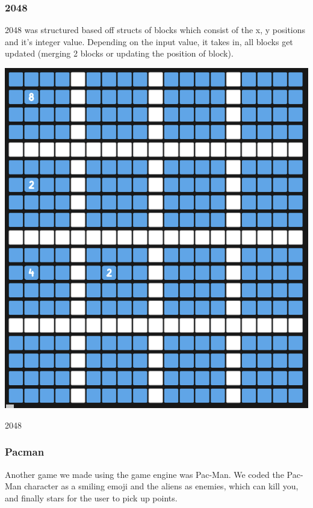 \documentclass{article}
\begin{document}
\pagebreak


\begin{multicols}{2}

\subsubsection{2048}
2048 was structured based off structs of blocks which consist of the x, y positions and it's integer value. Depending on the input value, it takes in, all blocks get updated (merging 2 blocks or updating the position of block).  \\

\begin{minipage}{\linewidth}
    \centering
    \includegraphics[width=0.8\linewidth]{2048.png}
    \captionsetup{type=figure}
    \caption{2048}
    \label{fig:game-engine-example}
\end{minipage}

\subsubsection{Pacman}
Another game we made using the game engine was Pac-Man. We coded the Pac-Man character as a smiling emoji and the aliens as enemies, which can kill you, and finally stars for the user to pick up points.\\


\end{multicols}
\end{document}
